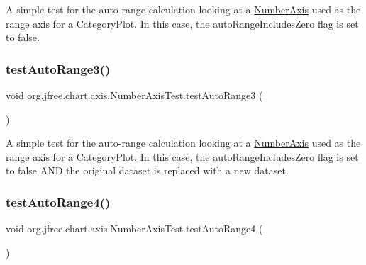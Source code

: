 A simple test for the auto-\/range calculation looking at a \mbox{\hyperlink{classorg_1_1jfree_1_1chart_1_1axis_1_1_number_axis}{Number\+Axis}} used as the range axis for a Category\+Plot. In this case, the \textquotesingle{}auto\+Range\+Includes\+Zero\textquotesingle{} flag is set to false. \mbox{\label{classorg_1_1jfree_1_1chart_1_1axis_1_1_number_axis_test_ab76758f65d24e8ff04e4aec7c68c3680}} 
\subsubsection{\texorpdfstring{test\+Auto\+Range3()}{testAutoRange3()}}
{\footnotesize\ttfamily void org.\+jfree.\+chart.\+axis.\+Number\+Axis\+Test.\+test\+Auto\+Range3 (\begin{DoxyParamCaption}{ }\end{DoxyParamCaption})}

A simple test for the auto-\/range calculation looking at a \mbox{\hyperlink{classorg_1_1jfree_1_1chart_1_1axis_1_1_number_axis}{Number\+Axis}} used as the range axis for a Category\+Plot. In this case, the \textquotesingle{}auto\+Range\+Includes\+Zero\textquotesingle{} flag is set to false A\+ND the original dataset is replaced with a new dataset. \mbox{\label{classorg_1_1jfree_1_1chart_1_1axis_1_1_number_axis_test_a0048f83c150cbfee0c04dc683fb750ee}} 
\subsubsection{\texorpdfstring{test\+Auto\+Range4()}{testAutoRange4()}}
{\footnotesize\ttfamily void org.\+jfree.\+chart.\+axis.\+Number\+Axis\+Test.\+test\+Auto\+Range4 (\begin{DoxyParamCaption}{ }\end{DoxyParamCaption})}

